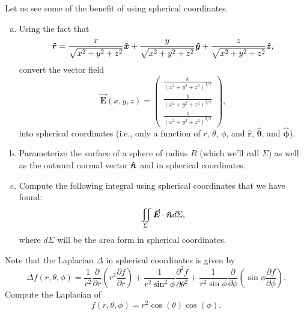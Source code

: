\documentclass[12pt]{article} %
\newcommand{\vecfieldE}{\boldsymbol{\vec{E}}}
\newcommand{\rhat}{\boldsymbol{\hat{r}}}
\newcommand{\thetahat}{\boldsymbol{\hat{\theta}}}
\newcommand{\phihat}{\boldsymbol{\hat{\phi}}}
\begin{document}
\begin{problem}
    Let us see some of the benefit of using spherical coordinates. 
    \begin{enumerate}[(a)]
        \item Using the fact that 
        \[
        \rhat = \frac{x}{\sqrt{x^2+y^2+z^2}}\xhat + \frac{y}{\sqrt{x^2+y^2+z^2}}\yhat + \frac{z}{\sqrt{x^2+y^2+z^2}}\zhat,
        \]
        convert the vector field 
        \[
        \vecfieldE(x,y,z) = \begin{pmatrix} \frac{x}{(x^2+y^2+z^2)^{3/2}} \\ \frac{y}{(x^2+y^2+z^2)^{3/2}} \\ \frac{z}{(x^2+y^2+z^2)^{3/2}} \end{pmatrix},
        \] into spherical coordinates (i.e., only a function of $r$, $\theta$, $\phi$, and $\rhat$, $\thetahat$, and $\phihat$).
        \item Parameterize the surface of a sphere of radius $R$ (which we'll call $\Sigma$) as well as the outward normal vector $\boldsymbol{\hat{n}}$ and  in spherical coordinates.
        \item Compute the following integral using spherical coordinates that we have found:
        \[
        \iint_\Sigma \vecfieldE \cdot \unitvec d\Sigma,
        \]
        where $d\Sigma$ will be the area form in spherical coordinates.
    \end{enumerate}
\end{problem}

\vspace*{.5cm}

\begin{problem}
    Note that the Laplacian $\Delta$ in spherical coordinates is given by
    \[
        \Delta f(r,\theta,\phi) = \frac{1}{r^2} \frac{\partial}{\partial r} \left(r^2 \frac{\partial f}{\partial r}\right)+\frac{1}{r^2 \sin^2 \phi} \frac{\partial^2 f}{\partial \theta^2} + \frac{1}{r^2 \sin\phi}\frac{\partial}{\partial \phi} \left(\sin \phi \frac{\partial f}{\partial \phi}\right).
    \]
    Compute the Laplacian of
    \[
       f(r,\theta,\phi) = r^2 \cos(\theta)\cos(\phi).
    \]
\end{problem}
\end{document}
